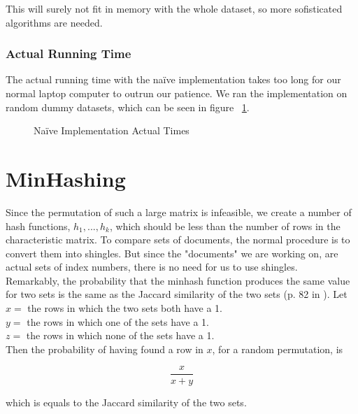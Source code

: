 \documentclass[a4paper,11pt]{article}
\begin{document}
This will surely not fit in memory with the whole dataset, so more sofisticated algorithms are needed. \\

\subsubsection{Actual Running Time}
The actual running time with the naïve implementation takes too long for our normal laptop computer to outrun our patience. We ran the implementation on random dummy datasets, which can be seen in figure ~\ref{fig:naive_at}.

\begin{figure}[!htbp]
    \begin{center}
        
        \caption{Naïve Implementation Actual Times}
        \label{fig:naive_at}
    \end{center}
\end{figure}


\section{MinHashing}
Since the permutation of such a large matrix is infeasible, we create a number of hash functions, $h_1, ..., h_k$, which should be less than the number of rows in the characteristic matrix. To compare sets of documents, the normal procedure is to convert them into shingles. But since the "documents" we are working on, are actual sets of index numbers, there is no need for us to use shingles. \\

Remarkably, the probability that the minhash function produces the same value for two sets is the same as the Jaccard similarity of the two sets (p. 82 in \cite{book:mmds}). Let \\

    $x = $ the rows in which the two sets both have a 1. \\
    $y = $ the rows in which one of the sets have a 1. \\
    $z = $ the rows in which none of the sets have a 1. \\

Then the probability of having found a row in $x$, for a random permutation, is

\begin{equation*}
    \frac{x}{x+y}
\end{equation*}

which is equals to the Jaccard similarity of the two sets.
\end{document}
